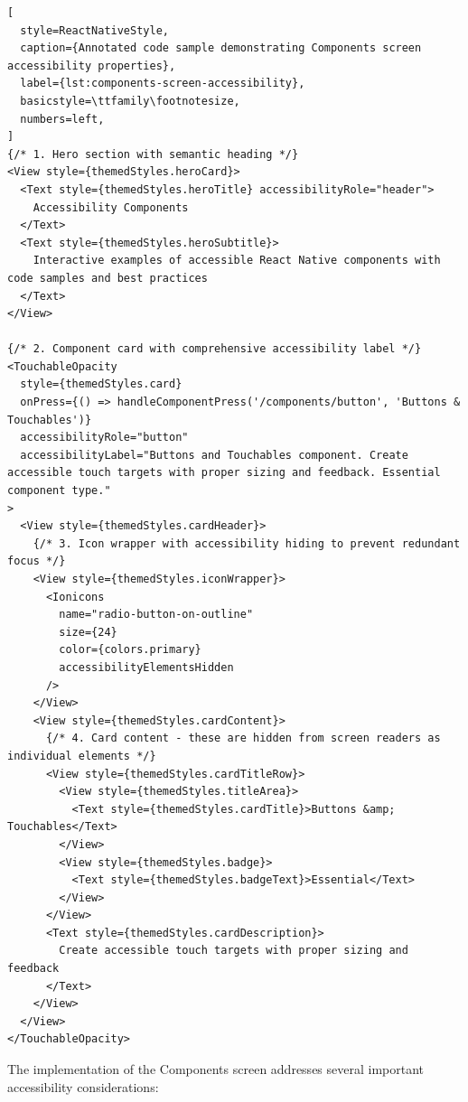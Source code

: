 \begin{lstlisting}[
  style=ReactNativeStyle,
  caption={Annotated code sample demonstrating Components screen accessibility properties},
  label={lst:components-screen-accessibility},
  basicstyle=\ttfamily\footnotesize,
  numbers=left,
]
{/* 1. Hero section with semantic heading */}
<View style={themedStyles.heroCard}>
  <Text style={themedStyles.heroTitle} accessibilityRole="header">
    Accessibility Components
  </Text>
  <Text style={themedStyles.heroSubtitle}>
    Interactive examples of accessible React Native components with code samples and best practices
  </Text>
</View>

{/* 2. Component card with comprehensive accessibility label */}
<TouchableOpacity
  style={themedStyles.card}
  onPress={() => handleComponentPress('/components/button', 'Buttons & Touchables')}
  accessibilityRole="button"
  accessibilityLabel="Buttons and Touchables component. Create accessible touch targets with proper sizing and feedback. Essential component type."
>
  <View style={themedStyles.cardHeader}>
    {/* 3. Icon wrapper with accessibility hiding to prevent redundant focus */}
    <View style={themedStyles.iconWrapper}>
      <Ionicons
        name="radio-button-on-outline"
        size={24}
        color={colors.primary}
        accessibilityElementsHidden
      />
    </View>
    <View style={themedStyles.cardContent}>
      {/* 4. Card content - these are hidden from screen readers as individual elements */}
      <View style={themedStyles.cardTitleRow}>
        <View style={themedStyles.titleArea}>
          <Text style={themedStyles.cardTitle}>Buttons &amp; Touchables</Text>
        </View>
        <View style={themedStyles.badge}>
          <Text style={themedStyles.badgeText}>Essential</Text>
        </View>
      </View>
      <Text style={themedStyles.cardDescription}>
        Create accessible touch targets with proper sizing and feedback
      </Text>
    </View>
  </View>
</TouchableOpacity>
\end{lstlisting}

The implementation of the Components screen addresses several important accessibility considerations:

